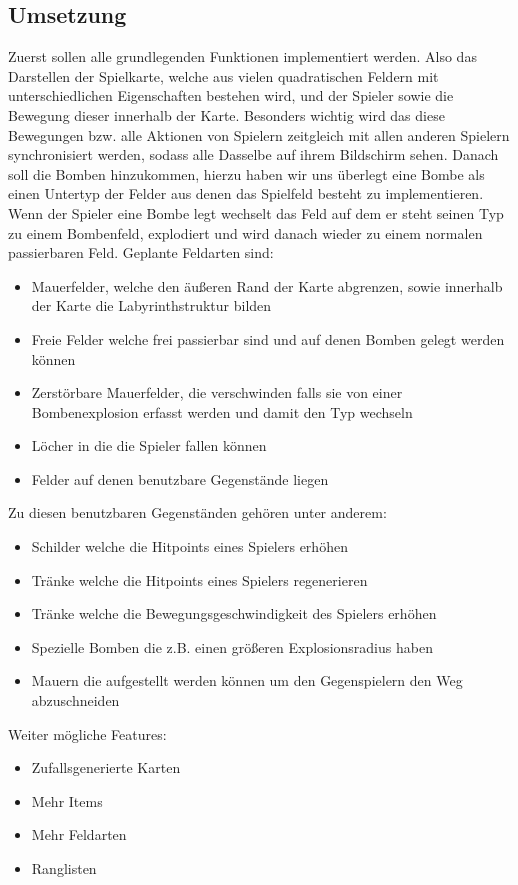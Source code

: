 \documentclass[10pt, a4paper]{report}
\begin{document}
	\subsection{Umsetzung}
	Zuerst sollen alle grundlegenden Funktionen implementiert werden. Also das Darstellen der Spielkarte, welche aus vielen quadratischen Feldern mit unterschiedlichen Eigenschaften bestehen wird, und der Spieler sowie die Bewegung dieser innerhalb der Karte. Besonders wichtig wird das diese Bewegungen bzw. alle Aktionen von Spielern zeitgleich mit allen anderen Spielern synchronisiert werden, sodass alle Dasselbe auf ihrem Bildschirm sehen. Danach soll die Bomben hinzukommen, hierzu haben wir uns überlegt eine Bombe als einen Untertyp der Felder aus denen das Spielfeld besteht zu implementieren. Wenn der Spieler eine Bombe legt wechselt das Feld auf dem er steht seinen Typ zu einem Bombenfeld, explodiert und wird danach wieder zu einem normalen passierbaren Feld. Geplante Feldarten sind: 
	\begin{itemize}
		\item Mauerfelder, welche den äußeren Rand der Karte abgrenzen, sowie innerhalb der Karte die Labyrinthstruktur bilden
		\item Freie Felder welche frei passierbar sind und auf denen Bomben gelegt werden können
		\item Zerstörbare Mauerfelder, die verschwinden falls sie von einer Bombenexplosion erfasst werden und damit den Typ wechseln
		\item Löcher in die die Spieler fallen können
		\item Felder auf denen benutzbare Gegenstände liegen
	\end{itemize}
	Zu diesen benutzbaren Gegenständen gehören unter anderem:
	\begin{itemize}
		\item Schilder welche die Hitpoints eines Spielers erhöhen
		\item Tränke welche die Hitpoints eines Spielers regenerieren
		\item Tränke welche die Bewegungsgeschwindigkeit des Spielers erhöhen
		\item Spezielle Bomben die z.B. einen größeren Explosionsradius haben
		\item Mauern die aufgestellt werden können um den Gegenspielern den Weg abzuschneiden
	\end{itemize}
	Weiter mögliche Features:
	\begin{itemize}
		\item Zufallsgenerierte Karten
		\item Mehr Items
		\item Mehr Feldarten
		\item Ranglisten
	\end{itemize}
\end{document}
